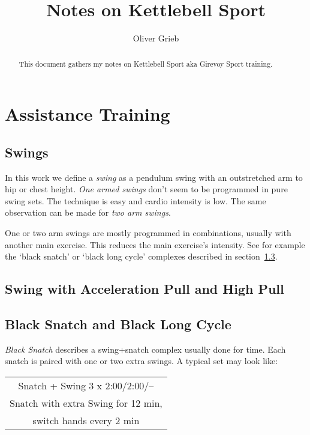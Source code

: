 \documentclass[a4paper,11pt,oneside]{article}
\author{Oliver Grieb}
\title{Notes on Kettlebell Sport}
\begin{document}
\maketitle

\begin{abstract}
This document gathers my notes on Kettlebell Sport aka Girevoy Sport training.
\end{abstract}


\section{Assistance Training}


\subsection{Swings}

In this work we define a \emph{swing} as a pendulum swing with an outstretched arm 
to hip or chest height.
\emph{One armed swings} don't seem to be programmed in pure swing sets. The technique 
is easy and cardio intensity is low. The same observation can be made for 
\emph{two arm swings}.

One or two arm swings are mostly programmed in combinations, usually with another main 
exercise. This reduces the main exercise's intensity. See for example the `black snatch' 
or `black long cycle' complexes described in section~\ref{blacksnatchlc}.


\subsection{Swing with Acceleration Pull and High Pull}




\subsection{Black Snatch and Black Long Cycle}
\label{blacksnatchlc}

\emph{Black Snatch} describes a swing+snatch complex usually done for time. Each 
snatch is paired with one or two extra swings. A typical set may look like:

\begin{center}
\begin{tabular}{c}
\hline
Snatch + Swing 3 x 2:00/2:00/-- \\
Snatch with extra Swing for 12 min, \\
switch hands every 2 min \\
\hline
\end{tabular}
\end{center}
\end{document}
